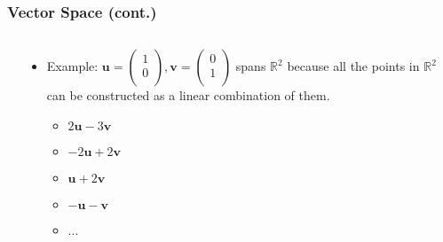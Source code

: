 \documentclass[pdflatex, 12pt]{beamer}
\newcommand{\R}{\mathbb{R}}
\begin{document}
\begin{frame}
\frametitle{Vector Space (cont.)}
\begin{columns}
\begin{column}{0.5\textwidth}
\centering
{}
\end{column}
\begin{column}{0.5\textwidth}
\begin{itemize}
\item Example: $\bm{u} = \begin{pmatrix}
1 \\
0 \\
\end{pmatrix}, \bm{v} = \begin{pmatrix}
0 \\
1 \\
\end{pmatrix}$ spans $\R^2$ because all the points in $\R^2$ can be constructed as a linear combination of them.
 \begin{itemize}
 \item $2\bm{u} - 3\bm{v}$
 \item $-2\bm{u} + 2\bm{v}$
 \item $\bm{u} + 2\bm{v}$
 \item $-\bm{u} - \bm{v}$
 \item ...
 \end{itemize}
\end{itemize}
\end{column}
\end{columns}
\end{frame}
\end{document}
